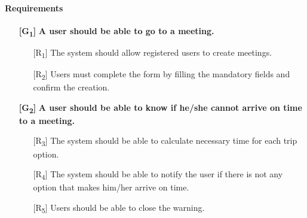 \documentclass[12pt,titlepage]{article}
\begin{document}
\paragraph{Requirements}
\begin{itemize}

\item[\textbf{ {[G\textsubscript{1}]}}]	\textbf{	A user should be able to go to a meeting.}
\begin{itemize}
\item[{[R\textsubscript{1}]}] The system should allow registered users to create meetings.
\item[{[R\textsubscript{2}]}] Users must complete the form by filling the mandatory fields and confirm the creation.

\end{itemize}
\item[\textbf{ {[G\textsubscript{2}]}}]	\textbf{	A user should be able to know if he/she cannot arrive on time to a meeting.}
\begin{itemize}
\item[{[R\textsubscript{3}]}] The system should be able to calculate necessary time for each trip option.
\item[{[R\textsubscript{4}]}]  The system should be able to notify the user if there is not any option that makes him/her arrive on time.
\item[{[R\textsubscript{5}]}] Users should be able to close the warning.
\end{itemize}


\end{itemize}
\end{document}
